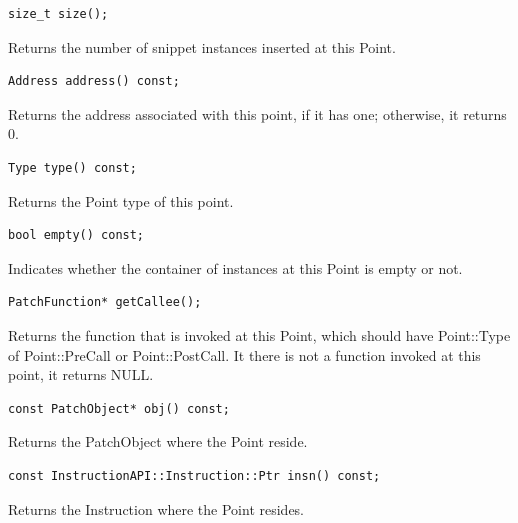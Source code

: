 \documentclass[11pt]{article}
\begin{document}
\begin{verbatim}
size_t size();

\end{verbatim}



Returns the number of snippet instances inserted at this Point.


\begin{verbatim}
Address address() const;

\end{verbatim}



Returns the address associated with this point, if it has one; otherwise, it
returns 0.


\begin{verbatim}
Type type() const;

\end{verbatim}



Returns the Point type of this point.


\begin{verbatim}
bool empty() const;

\end{verbatim}



Indicates whether the container of instances at this Point is empty or not.


\begin{verbatim}
PatchFunction* getCallee();

\end{verbatim}



Returns the function that is invoked at this Point, which should have
Point::Type of Point::PreCall or Point::PostCall. It there is not a function
invoked at this point, it returns NULL.


\begin{verbatim}
const PatchObject* obj() const;

\end{verbatim}



Returns the PatchObject where the Point reside.


\begin{verbatim}
const InstructionAPI::Instruction::Ptr insn() const;

\end{verbatim}



Returns the Instruction where the Point resides.
\end{document}
